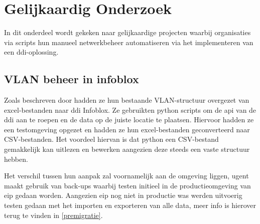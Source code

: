 \section{Gelijkaardig Onderzoek}
In dit onderdeel wordt gekeken naar gelijkaardige projecten waarbij organisaties via scripts hun manueel netwerkbeheer automatiseren via het implementeren van een \acrshort{ddi}-oplossing.

\subsection{VLAN beheer in infoblox}
Zoals beschreven door \textcite{Karaoui2023} hadden ze hun bestaande VLAN-structuur overgezet van excel-bestanden naar \acrshort{ddi} Infoblox. Ze gebruikten python scripts om de \acrshort{api} van de \acrshort{ddi} aan te roepen en de data op de juiste locatie te plaatsen. Hiervoor hadden ze een testomgeving opgezet en hadden ze hun excel-bestanden geconverteerd naar CSV-bestanden. Het voordeel hiervan is dat python een CSV-bestand gemakkelijk kan uitlezen en bewerken aangezien deze steeds een vaste structuur hebben.

Het verschil tussen hun aanpak zal voornamelijk aan de omgeving liggen, \acrshort{ugent} maakt gebruik van back-ups waarbij testen initieel in de productieomgeving van \acrshort{eip} gedaan worden. Aangezien \acrshort{eip} nog niet in productie was werden uitvoerig testen gedaan met het importen en exporteren van alle data, meer info is hierover terug te vinden in \ref{premigratie}.

